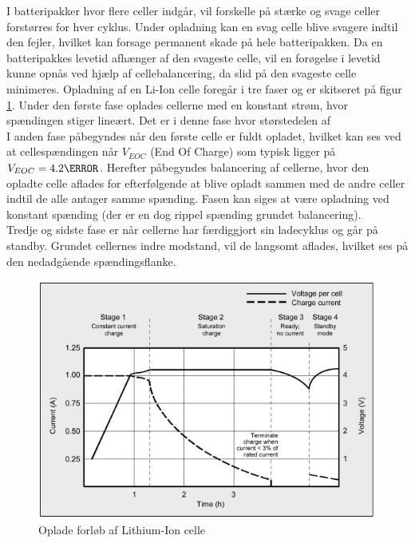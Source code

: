 I batteripakker hvor flere celler indgår, vil forskelle på stærke og svage celler forstørres for hver cyklus. Under opladning kan en svag celle blive svagere indtil den fejler, hvilket kan forsage permanent skade på hele batteripakken. Da en batteripakkes levetid afhænger af den svageste celle, vil en forøgelse i levetid kunne opnås ved hjælp af cellebalancering, da slid på den svageste celle minimeres. Opladning af en Li-Ion celle foregår i tre faser og er skitseret på figur \ref{fig:opladning_liion}.
Under den første fase oplades cellerne med en konstant strøm, hvor spændingen stiger lineært. Det er i denne fase hvor størstedelen af
\\

I anden fase påbegyndes når den første celle er fuldt opladet, hvilket kan ses ved at cellespændingen når $V_{EOC}$ (End Of Charge) som typisk ligger på $V_{EOC} = 4.2 \volt$. Herefter påbegyndes balancering af cellerne, hvor den opladte celle aflades for efterfølgende at blive opladt sammen med de andre celler indtil de alle antager samme spænding.
Fasen kan siges at være opladning ved konstant spænding (der er en dog rippel spænding grundet balancering).
\\

Tredje og sidste fase er når cellerne har færdiggjort sin ladecyklus og går på standby. Grundet cellernes indre modstand, vil de langsomt aflades, hvilket ses på den nedadgående spændingsflanke.

\begin{figure}[h]
	\centering
	\includegraphics[width=15cm]{billeder/liion_opladning.png}
	\caption{Oplade forløb af Lithium-Ion celle}
	\label{fig:opladning_liion}
\end{figure}
\FloatBlock

